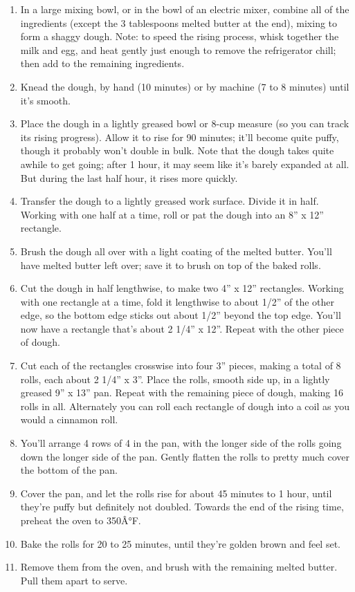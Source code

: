 \documentclass[
  letterpaper,
  DIV=11,
  numbers=noendperiod,
  titlepage=false]{scrreprt}
\providecommand{\tightlist}{%
  \setlength{\itemsep}{0pt}\setlength{\parskip}{0pt}}\usepackage{longtable,booktabs,array}
\begin{document}
\begin{enumerate}
\def\labelenumi{\arabic{enumi}.}
\tightlist
\item
  In a large mixing bowl, or in the bowl of an electric mixer, combine
  all of the ingredients (except the 3 tablespoons melted butter at the
  end), mixing to form a shaggy dough. Note: to speed the rising
  process, whisk together the milk and egg, and heat gently just enough
  to remove the refrigerator chill; then add to the remaining
  ingredients.
\item
  Knead the dough, by hand (10 minutes) or by machine (7 to 8 minutes)
  until it's smooth.
\item
  Place the dough in a lightly greased bowl or 8-cup measure (so you can
  track its rising progress). Allow it to rise for 90 minutes; it'll
  become quite puffy, though it probably won't double in bulk. Note that
  the dough takes quite awhile to get going; after 1 hour, it may seem
  like it's barely expanded at all. But during the last half hour, it
  rises more quickly.
\item
  Transfer the dough to a lightly greased work surface. Divide it in
  half. Working with one half at a time, roll or pat the dough into an
  8'' x 12'' rectangle.
\item
  Brush the dough all over with a light coating of the melted butter.
  You'll have melted butter left over; save it to brush on top of the
  baked rolls.
\item
  Cut the dough in half lengthwise, to make two 4'' x 12'' rectangles.
  Working with one rectangle at a time, fold it lengthwise to about
  1/2'' of the other edge, so the bottom edge sticks out about 1/2''
  beyond the top edge. You'll now have a rectangle that's about 2 1/4''
  x 12''. Repeat with the other piece of dough.
\item
  Cut each of the rectangles crosswise into four 3'' pieces, making a
  total of 8 rolls, each about 2 1/4'' x 3''. Place the rolls, smooth
  side up, in a lightly greased 9'' x 13'' pan. Repeat with the
  remaining piece of dough, making 16 rolls in all. Alternately you can
  roll each rectangle of dough into a coil as you would a cinnamon roll.
\item
  You'll arrange 4 rows of 4 in the pan, with the longer side of the
  rolls going down the longer side of the pan. Gently flatten the rolls
  to pretty much cover the bottom of the pan.
\item
  Cover the pan, and let the rolls rise for about 45 minutes to 1 hour,
  until they're puffy but definitely not doubled. Towards the end of the
  rising time, preheat the oven to 350Â°F.
\item
  Bake the rolls for 20 to 25 minutes, until they're golden brown and
  feel set.
\item
  Remove them from the oven, and brush with the remaining melted butter.
  Pull them apart to serve.
\end{enumerate}
\end{document}
